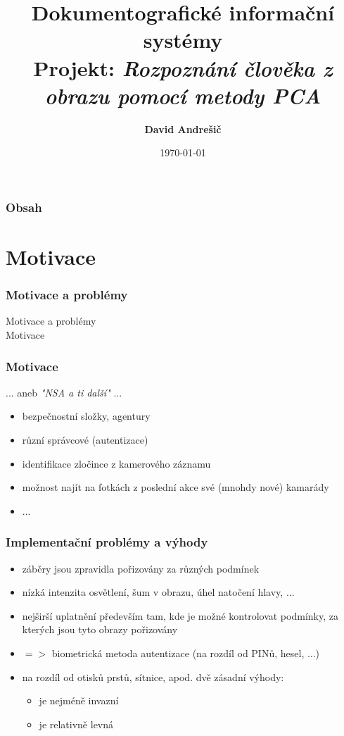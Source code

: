 \documentclass{beamer}
\author{\textbf{David Andrešič}}
\title{\textbf{Dokumentografické informační systémy} \\ Projekt: \textit{Rozpoznání člověka z obrazu pomocí metody PCA}}
\institute[ ]{VŠB - Technická univerzita Ostrava}
\date{\today}
\begin{document}

\begin{frame}
  \titlepage
\end{frame}


\begin{frame}
  \frametitle{Obsah}
  \tiny  
  \tableofcontents
\end{frame}


\section{Motivace}
\begin{frame}

\begin{center}
\frametitle{Motivace a problémy}
	\huge Motivace a problémy\\[1.5cm]
	\large Motivace
\end{center}

\end{frame}

\begin{frame}
\frametitle{Motivace}
... aneb \textit{"NSA a ti další"} ...
\begin{itemize}
	\item bezpečnostní složky, agentury
	\item různí správcové (autentizace)
	\item identifikace zločince z kamerového záznamu
	\item možnost najít na fotkách z poslední akce své (mnohdy nové) kamarády
	\item ...
\end{itemize}
\end{frame}

\begin{frame}
\frametitle{Implementační problémy a výhody}

\begin{itemize}
	\item záběry jsou zpravidla pořizovány za různých podmínek
	\item nízká intenzita osvětlení, šum v obrazu, úhel natočení hlavy, ...
	\item nejširší uplatnění především tam, kde je možné kontrolovat podmínky, za kterých jsou tyto obrazy pořizovány
	\item $=>$ biometrická metoda autentizace (na rozdíl od PINů, hesel, ...)
	\item na rozdíl od otisků prstů, sítnice, apod. dvě zásadní výhody: 
		\begin{itemize}
			\item je nejméně invazní
			\item je relativně levná		
		\end{itemize}			
\end{itemize}
\end{frame}
\end{document}
